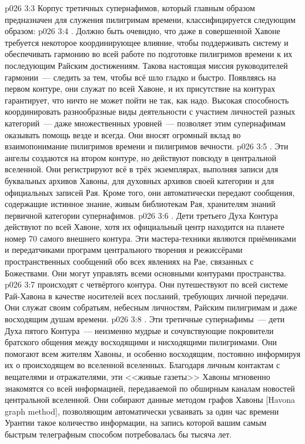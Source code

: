\vs p026 3:3 \pc Корпус третичных супернафимов, который главным образом предназначен для служения пилигримам времени, классифицируется следующим образом:
\vs p026 3:4 . Должно быть очевидно, что даже в совершенной Хавоне требуется некоторое координирующее влияние, чтобы поддерживать систему и обеспечивать гармонию во всей работе по подготовке пилигримов времени к их последующим Райским достижениям. Такова настоящая миссия руководителей гармонии~--- следить за тем, чтобы всё шло гладко и быстро. Появляясь на первом контуре, они служат по всей Хавоне, и их присутствие на контурах гарантирует, что ничто не может пойти не так, как надо. Высокая способность координировать разнообразные виды деятельности с участием личностей разных категорий~--- даже множественных уровней~--- позволяет этим супернафимам оказывать помощь везде и всегда. Они вносят огромный вклад во взаимопонимание пилигримов времени и пилигримов вечности.
\vs p026 3:5 . Эти ангелы создаются на втором контуре, но действуют повсюду в центральной вселенной. Они регистрируют всё в трёх экземплярах, выполняя записи для буквальных архивов Хавоны, для духовных архивов своей категории и для официальных записей Рая. Кроме того, они автоматически передают сообщения, содержащие истинное знание, живым библиотекам Рая, хранителям знаний первичной категории супернафимов.
\vs p026 3:6 . Дети третьего Духа Контура действуют по всей Хавоне, хотя их официальный центр находится на планете номер 70 самого внешнего контура. Эти мастера\hyp{}техники являются приёмниками и передатчиками программ центрального творения и режиссёрами пространственных сообщений обо всех явлениях на Рае, связанных с Божествами. Они могут управлять всеми основными контурами пространства.
\vs p026 3:7  происходят с четвёртого контура. Они путешествуют по всей системе Рай\hyp{}Хавона в качестве носителей всех посланий, требующих личной передачи. Они служат своим собратьям, небесным личностям, Райским пилигримам и даже восходящим душам времени.
\vs p026 3:8 . Эти третичные супернафимы~--- дети Духа пятого Контура~--- неизменно мудрые и сочувствующие покровители братского общения между восходящими и нисходящими пилигримами. Они помогают всем жителям Хавоны, и особенно восходящим, постоянно информируя их о происходящем во вселенной вселенных. Благодаря личным контактам с вещателями и отражателями, эти <<живые газеты>> Хавоны мгновенно знакомятся со всей информацией, передаваемой по обширным каналам новостей центральной вселенной. Они собирают данные методом графов Хавоны [Havona graph method], позволяющим автоматически усваивать за один час времени Урантии такое количество информации, на запись которой вашим самым быстрым телеграфным способом потребовалась бы тысяча лет.
